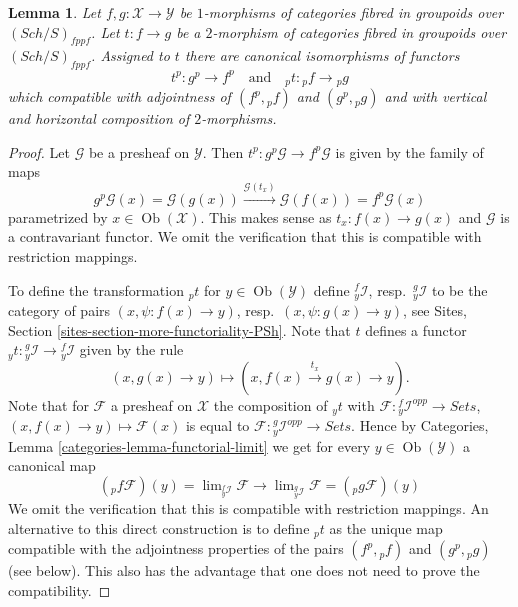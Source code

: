 \documentclass[10pt,a4paper]{amsart}
\theoremstyle{plain}
\newtheorem{lemma}[subsection]{Lemma}
\theoremstyle{definition}
\theoremstyle{remark}
\numberwithin{equation}{subsection}
\def\lim{\mathop{\mathrm{lim}}\nolimits}
\def\Sch{\mathit{Sch}}
\def\Ob{\mathop{\mathrm{Ob}}\nolimits}
\begin{document}
\begin{lemma}
\label{lemma-2-morphisms-presheaves}
Let $f, g : \mathcal{X} \to \mathcal{Y}$ be $1$-morphisms of categories
fibred in groupoids over $(\Sch/S)_{fppf}$. Let $t : f \to g$
be a $2$-morphism of categories fibred in groupoids over
$(\Sch/S)_{fppf}$. Assigned to $t$ there are canonical
isomorphisms of functors
$$
t^p : g^p \longrightarrow f^p
\quad\text{and}\quad
{}_pt : {}_pf \longrightarrow {}_pg
$$
which compatible with adjointness of $(f^p, {}_pf)$ and
$(g^p, {}_pg)$ and with
vertical and horizontal composition of $2$-morphisms.
\end{lemma}

\begin{proof}
Let $\mathcal{G}$ be a presheaf on $\mathcal{Y}$. Then
$t^p : g^p\mathcal{G} \to f^p\mathcal{G}$ is given by the family
of maps
$$
g^p\mathcal{G}(x) = \mathcal{G}(g(x))
\xrightarrow{\mathcal{G}(t_x)}
\mathcal{G}(f(x)) = f^p\mathcal{G}(x)
$$
parametrized by $x \in \Ob(\mathcal{X})$. This makes sense as
$t_x : f(x) \to g(x)$ and $\mathcal{G}$ is a contravariant functor.
We omit the verification that this is compatible with restriction
mappings.

\medskip\noindent
To define the transformation ${}_pt$ for $y \in \Ob(\mathcal{Y})$
define ${}_y^f\mathcal{I}$, resp.\ ${}_y^g\mathcal{I}$ to be the category
of pairs $(x, \psi : f(x) \to y)$, resp.\ $(x, \psi : g(x) \to y)$, see
Sites, Section \ref{sites-section-more-functoriality-PSh}.
Note that $t$ defines a functor
${}_yt : {}_y^g\mathcal{I} \to {}_y^f\mathcal{I}$
given by the rule
$$
(x, g(x) \to y) \longmapsto (x, f(x) \xrightarrow{t_x} g(x) \to y).
$$
Note that for $\mathcal{F}$ a presheaf on $\mathcal{X}$ the composition
of ${}_yt$ with $\mathcal{F} : {}_y^f\mathcal{I}^{opp} \to \textit{Sets}$,
$(x, f(x) \to y) \mapsto \mathcal{F}(x)$ is equal to
$\mathcal{F} : {}_y^g\mathcal{I}^{opp} \to \textit{Sets}$. Hence by
Categories, Lemma \ref{categories-lemma-functorial-limit}
we get for every $y \in \Ob(\mathcal{Y})$ a canonical map
$$
({}_pf\mathcal{F})(y) = \lim_{{}_y^f\mathcal{I}} \mathcal{F}
\longrightarrow
\lim_{{}_y^g\mathcal{I}} \mathcal{F} = ({}_pg\mathcal{F})(y)
$$
We omit the verification that this is compatible with restriction
mappings. An alternative to this direct construction is to define
${}_pt$ as the unique map compatible with the adjointness properties
of the pairs $(f^p, {}_pf)$ and $(g^p, {}_pg)$ (see below). This also
has the advantage that one does not need to prove the compatibility.


\end{proof}
\end{document}
